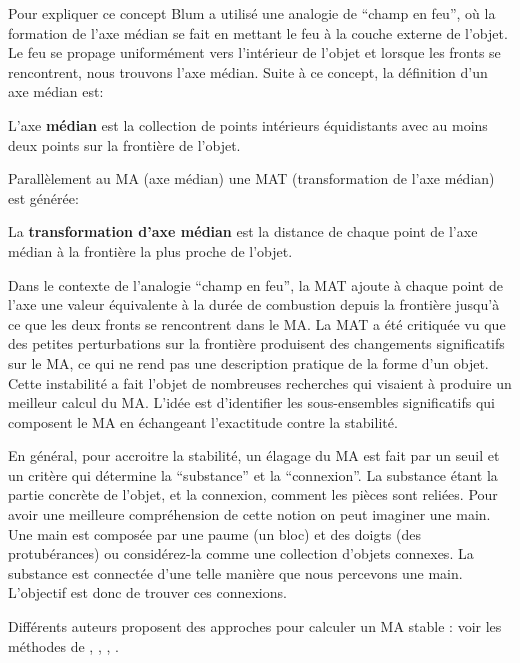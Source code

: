 Pour expliquer ce concept Blum a utilisé une analogie de ``champ en feu'', où la formation de l'axe médian se fait en mettant le feu à la couche externe de l'objet. Le feu se propage uniformément vers l'intérieur de l'objet et lorsque les fronts se rencontrent, nous trouvons l'axe médian.%
Suite à ce concept, la définition d'un axe médian est:
\begin{definition}
L'axe \textbf{médian} est la collection de points intérieurs équidistants avec au moins deux points sur la frontière de l'objet.
\label{def:medialAxisfr}
\end{definition}

Parallèlement au MA (axe médian) une MAT (transformation de l'axe médian) est générée:

\begin{definition}
La \textbf{transformation d'axe médian} est la distance de chaque point de l'axe médian à la frontière la plus proche de l'objet.
\end{definition}

Dans le contexte de l'analogie ``champ en feu'', la MAT ajoute à chaque point de l'axe une valeur équivalente à la durée de combustion depuis la frontière jusqu'à ce que les deux fronts se rencontrent dans le MA.
La MAT a été critiquée vu que des petites perturbations sur la frontière produisent des changements significatifs sur le MA, ce qui ne rend pas une description pratique de la forme d'un objet.
Cette instabilité a fait l'objet de nombreuses recherches qui visaient à produire un meilleur calcul du MA.
L'idée est d'identifier les sous-ensembles significatifs qui composent le MA en échangeant l'exactitude contre la stabilité.

En général, pour accroitre la stabilité, un élagage du MA est fait par un seuil et un critère qui détermine la ``substance'' et la ``connexion''. La substance étant la partie concrète de l'objet, et la connexion, comment les pièces sont reliées.
Pour avoir une meilleure compréhension de cette notion on peut imaginer une main.
Une main est composée par une paume (un bloc) et des doigts (des protubérances) ou considérez-la comme une collection d'objets connexes. 
La substance est connectée d'une telle manière que nous percevons une main.
L'objectif est donc de trouver ces connexions.

Différents auteurs proposent des approches pour calculer un MA stable : voir les méthodes de
\cite{culver1999accurate}, \cite{amenta2001power}, \cite{katz2003untangling}, \cite{miklos2010discrete}.

